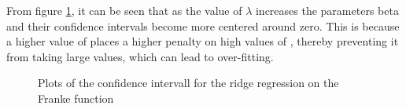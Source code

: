 \documentclass{article}
\begin{document}
From figure \ref{RidgeConfInt}, it can be seen that as the value of $\lambda$ increases the parameters beta and their confidence intervals become more centered around zero. This is because a higher value of  places a higher penalty on high values of , thereby preventing it from taking large values, which can lead to over-fitting.
\begin{figure}[ht]\centering
{}\hfill
{} \par
{}
\caption{Plots of the confidence intervall for the ridge regression on the Franke function}
\label{RidgeConfInt}
\end{figure}
\end{document}
